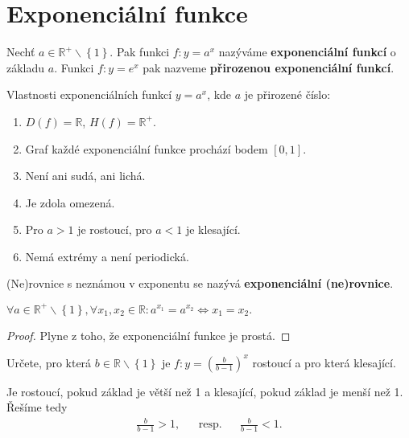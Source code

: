 \section{Exponenciální funkce}
\begin{definition}
    Nechť $a\in \mathbb R^+ \smallsetminus \left \{ 1 \right \}. $ Pak funkci $f:y=a^x$
    nazýváme \textbf{exponenciální funkcí} o základu $a$. Funkci $f:y=e^x$ pak
    nazveme \textbf{přirozenou exponenciální funkcí}.
\end{definition}

\begin{veta}
    Vlastnosti exponenciálních funkcí $y= a^x$, kde $a$ je přirozené číslo:
    \begin{enumerate}[$i.$]
        \item $D(f)= \mathbb R$, $H(f)= \mathbb R^+$.
       	\item Graf každé exponenciální funkce prochází bodem $[0,1].$
        \item Není ani sudá, ani lichá.
        \item Je zdola omezená.
        \item Pro $a >1$ je rostoucí, pro $a<1$ je klesající.
        \item Nemá extrémy a není periodická.
    \end{enumerate}
\end{veta}

\begin{definition}
    (Ne)rovnice s neznámou v exponentu se nazývá \textbf{exponenciální (ne)rovnice}.
\end{definition}

\begin{veta}
    $\forall a \in \mathbb R^+ \smallsetminus \left \{ 1 \right \}, \forall x_1, x_2
    \in \mathbb R: a^{x_1}=a^{x_2}\iff x_1=x_2.$
\end{veta}

\begin{proof}
    Plyne z toho, že exponenciální funkce je prostá.
\end{proof}

\begin{priklad}
Určete, pro která $b\in \mathbb R\smallsetminus\left \{ 1 \right \} $ je $f:y=\left ( \frac{b}{b-1} \right )^x $
rostoucí a pro která klesající.
\end{priklad}

\begin{reseni}
Je rostoucí, pokud základ je větší než 1 a klesající, pokud základ je menší než 1.
Řešíme tedy
\begin{align*}
\frac{b}{b-1}>1, & & \textrm{resp.} & & \frac{b}{b-1}<1.
\end{align*}
\end{reseni}

